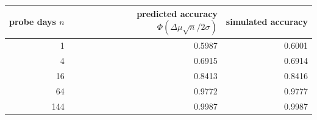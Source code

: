 \begin{tabular}{rrr}
\toprule
probe days $n$ & predicted accuracy $\Phi(\Delta\mu\sqrt n/2\sigma)$ & simulated accuracy \\
\midrule
1 & 0.5987 & 0.6001 \\
4 & 0.6915 & 0.6914 \\
16 & 0.8413 & 0.8416 \\
64 & 0.9772 & 0.9777 \\
144 & 0.9987 & 0.9987 \\
\bottomrule
\end{tabular}

